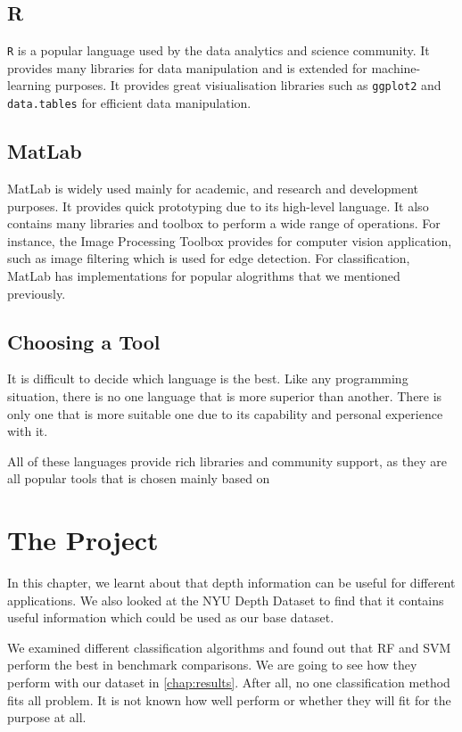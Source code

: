 \subsection{R}
\texttt{R} is a popular language used by the data analytics and science community. It provides many libraries for data manipulation and is extended for machine-learning purposes. It provides great visiualisation libraries such as \texttt{ggplot2} and \texttt{data.tables} for efficient data manipulation.


\subsection{MatLab}
MatLab is widely used mainly for academic, and research and development purposes. It provides quick prototyping due to its high-level language. It also contains many libraries and toolbox to perform a wide range of operations. For instance, the Image Processing Toolbox provides for computer vision application, such as image filtering which is used for edge detection. For classification, MatLab has implementations for popular alogrithms that we mentioned previously. 


\subsection{Choosing a Tool}
It is difficult to decide which language is the best. Like any programming situation, there is no one language that is more superior than another. There is only one that is more suitable one due to its capability and personal experience with it.

All of these languages provide rich libraries and community support, as they are all popular tools that is chosen mainly based on 


\section{The Project}
In this chapter, we learnt about that depth information can be useful for different applications. We also looked at the NYU Depth Dataset to find that it contains useful information which could be used as our base dataset.

We examined different classification algorithms and found out that RF and SVM perform the best in benchmark comparisons. We are going to see how they perform with our dataset in \autoref{chap:results}. After all, no one classification method fits all problem. It is not known how well perform or whether they will fit for the purpose at all.


